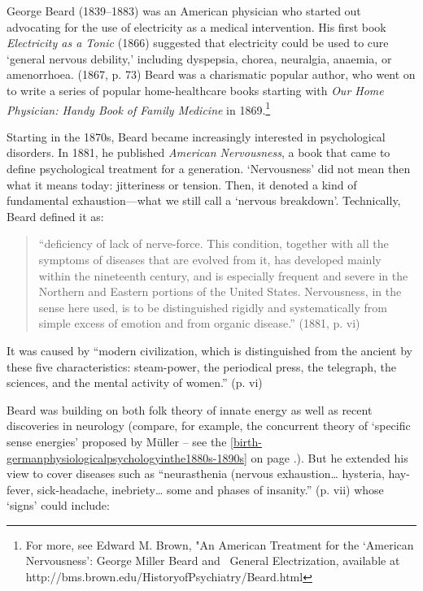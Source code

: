 George Beard (1839--1883) was an American physician who started out advocating for the use of electricity as a medical intervention. His first book \emph{Electricity as a Tonic} (1866) suggested that electricity could be used to cure `general nervous debility,' including dyspepsia, chorea, neuralgia, anaemia, or amenorrhoea. (1867, p. 73) Beard was a charismatic popular author, who went on to write a series of popular home-healthcare books starting with \emph{Our Home Physician: Handy Book of Family Medicine} in 1869.\footnote{For more, see Edward M. Brown, "An American Treatment for the `American Nervousness': George Miller Beard and  General Electrization, available at http:\slash \slash bms.brown.edu\slash HistoryofPsychiatry\slash Beard.html}

Starting in the 1870s, Beard became increasingly interested in psychological disorders. In 1881, he published \emph{American Nervousness}, a book that came to define psychological treatment for a generation. `Nervousness' did not mean then what it means today: jitteriness or tension. Then, it denoted a kind of fundamental exhaustion---what we still call a `nervous breakdown'. Technically, Beard defined it as:

\begin{quote}

``deficiency of lack of nerve-force. This condition, together with all the symptoms of diseases that are evolved from it, has developed mainly within the nineteenth century, and is especially frequent and severe in the Northern and Eastern portions of the United States. Nervousness, in the sense here used, is to be distinguished rigidly and systematically from simple excess of emotion and from organic disease.'' (1881, p. vi)
\end{quote}

It was caused by ``modern civilization, which is distinguished from the ancient by these five characteristics: steam-power, the periodical press, the telegraph, the sciences, and the mental activity of women.'' (p. vi)

Beard was building on both folk theory of innate energy as well as recent discoveries in neurology (compare, for example, the concurrent theory of `specific sense energies' proposed by Müller – see the \ref{birth-germanphysiologicalpsychologyinthe1880s-1890s} on page \pageref{birth-germanphysiologicalpsychologyinthe1880s-1890s}.). But he extended his view to cover diseases such as ``neurasthenia (nervous exhaustion{\ldots} hysteria, hay-fever, sick-headache, inebriety{\ldots} some and phases of insanity.'' (p. vii) whose `signs' could include:


